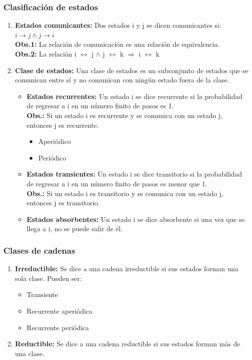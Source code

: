 \documentclass{templateNote}
\begin{document}
\subsubsection{Clasificación de estados}
\begin{enumerate}
    \item \textbf{Estados comunicantes:} Dos estados i y j se dicen comunicantes si: $i \rightarrow j \land j \rightarrow i$\\
    \textbf{Obs.1:} La relación de comunicación es una relación de equivalencia.\\
    \textbf{Obs.2:} La relación i $\leftrightarrow$ j $\land$ j $\leftrightarrow$ k $\Rightarrow$ i $\leftrightarrow$ k
    \item \textbf{Clase de estados:} Una clase de estados es un subconjunto de estados que se comunican entre sí y no comunican con ningún estado fuera de la clase.
    \begin{itemize}
        \item \textbf{Estados recurrentes:} Un estado i se dice recurrente si la probabilidad de regresar a i en un número finito de pasos es 1.\\
        \textbf{Obs.:} Si un estado i es recurrente y se comunica con un estado j, entonces j es recurrente.
        \begin{itemize}[label=$\circ$]
            \item Aperiódico
            \item Periódico
        \end{itemize}
        \item \textbf{Estados transientes:} Un estado i se dice transitorio si la probabilidad de regresar a i en un número finito de pasos es menor que 1.\\
        \textbf{Obs.:} Si un estado i es transitorio y se comunica con un estado
        j, entonces j es transitorio.
        \item \textbf{Estados absorbentes:} Un estado i se dice absorbente si una vez que se llega a i, no se puede salir de él.
    \end{itemize}
\end{enumerate}

\subsubsection{Clases de cadenas}
\begin{enumerate}
    \item \textbf{Irreductible:} Se dice a una cadena irreductible si sus estados forman una sola clase. Pueden ser:
    \begin{itemize}
        \item Transiente
        \item Recurrente aperiódica
        \item Recurrente periódica
    \end{itemize}
    \item \textbf{Reductible:} Se dice a una cadena reductible si sus estados forman más de una clase.
\end{enumerate}
\end{document}
